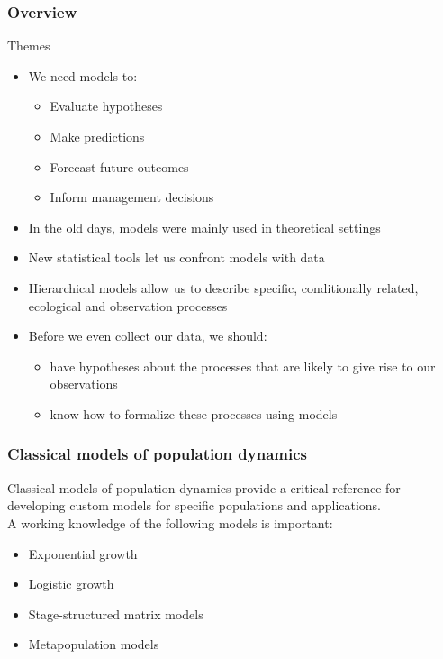 \documentclass{beamer}\usepackage[]{graphicx}\usepackage[]{color}
\begin{document}
\begin{frame}
  \frametitle{Overview}
  {\Large Themes}
  \begin{itemize}
    \item<1-| grayout@6-> We need models to:
      \begin{itemize}[<1-| grayout@6->]
        \item Evaluate hypotheses
        \item Make predictions
        \item Forecast future outcomes
        \item Inform management decisions
      \end{itemize}
    \item<3-| grayout@6-> In the old days, models were mainly used in theoretical settings
    \item<4-| grayout@6-> New statistical tools let us confront models with data
    \item<5-> Hierarchical models allow us to describe specific,
      conditionally related, ecological and observation processes
    \item<6-> Before we even collect our data, we should:
      \begin{itemize}
        \item have hypotheses about the processes that are likely to give
          rise to our observations
        \item know how to formalize these processes using models
      \end{itemize}
  \end{itemize}
\end{frame}




\begin{frame}
  \frametitle{Classical models of population dynamics}
  Classical models of population dynamics provide a critical reference
  for developing custom models for specific populations and
  applications. \\
  \pause
  \vfill
  A working knowledge of the following models is important:
  \begin{itemize}
    \item Exponential growth
    \item Logistic growth
    \item Stage-structured matrix models
    \item Metapopulation models
  \end{itemize}
\end{frame}
\end{document}
